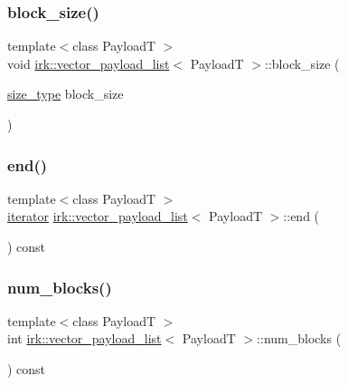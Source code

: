 \subsubsection{\texorpdfstring{block\+\_\+size()}{block\_size()}\hspace{0.1cm}{\footnotesize\ttfamily [2/2]}}
{\footnotesize\ttfamily template$<$class PayloadT $>$ \\
void \mbox{\hyperlink{classirk_1_1vector__payload__list}{irk\+::vector\+\_\+payload\+\_\+list}}$<$ PayloadT $>$\+::block\+\_\+size (\begin{DoxyParamCaption}\item[{\mbox{\hyperlink{classirk_1_1vector__payload__list_a319d51342d589c056943998b362120ca}{size\+\_\+type}}}]{block\+\_\+size }\end{DoxyParamCaption})\hspace{0.3cm}{\ttfamily [inline]}}

\mbox{\label{classirk_1_1vector__payload__list_ae8f6de3134a3fbb22ff3334363c1e583}} 
\subsubsection{\texorpdfstring{end()}{end()}}
{\footnotesize\ttfamily template$<$class PayloadT $>$ \\
\mbox{\hyperlink{classirk_1_1vector__payload__list_a33f425e324f556bba403c1700ff9915e}{iterator}} \mbox{\hyperlink{classirk_1_1vector__payload__list}{irk\+::vector\+\_\+payload\+\_\+list}}$<$ PayloadT $>$\+::end (\begin{DoxyParamCaption}{ }\end{DoxyParamCaption}) const\hspace{0.3cm}{\ttfamily [inline]}}

\mbox{\label{classirk_1_1vector__payload__list_a7b28927adf91d29429f4089a3af41d19}} 
\subsubsection{\texorpdfstring{num\+\_\+blocks()}{num\_blocks()}}
{\footnotesize\ttfamily template$<$class PayloadT $>$ \\
int \mbox{\hyperlink{classirk_1_1vector__payload__list}{irk\+::vector\+\_\+payload\+\_\+list}}$<$ PayloadT $>$\+::num\+\_\+blocks (\begin{DoxyParamCaption}{ }\end{DoxyParamCaption}) const\hspace{0.3cm}{\ttfamily [inline]}}

